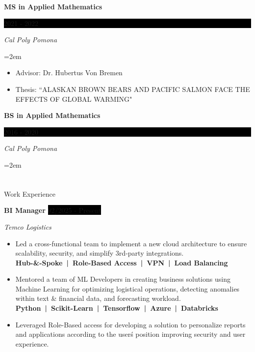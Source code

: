 \documentclass[paper=a4,fontsize=10pt]{scrartcl} %
\newcommand{\sepspace}{\vspace*{1em}}		%
\newcommand{\NewPart}[1]{\section*{\uppercase{#1}}}
\newcommand{\EducationEntry}[4]{
		\noindent \textbf{#1} \hfill      %
		\colorbox{Black}{%
			\parbox{5em}{%
			\hfill\color{White}#2}} \par  %
		\noindent \textit{#3} \par        %
		\noindent\hangindent=2em\hangafter=0 \small #4 %
		\normalsize \par}
\newcommand{\WorkEntry}[4]{				  %
		\noindent \textbf{#1} \hfill      %
		\colorbox{Black}{\color{White}#2} \par  %
		\noindent \textit{#3} \par              %
		\noindent \small #4 %
		\normalsize}
\begin{document}

\EducationEntry{MS in Applied Mathematics}{2021 - 2022}{Cal Poly Pomona}
{
\begin{itemize}
    \item Advisor: Dr. Hubertus Von Bremen
    \item Thesis: ``\uppercase{Alaskan Brown Bears and Pacific Salmon Face the Effects of Global Warming}"
\end{itemize}
}
\sepspace

\EducationEntry{BS in Applied Mathematics}{2016 - 2020}{Cal Poly Pomona}



\NewPart{Work Experience}{}

\WorkEntry{BI Manager}
{02/2025 - Present}
{Temco Logistics}
{\begin{itemize}[leftmargin=*]
   \item 
        Led a cross-functional team to implement a new cloud architecture 
        to ensure scalability, security, and simplify 3rd-party 
        integrations.\\ 
        \scriptsize{\textbf{Hub-\&-Spoke~|~Role-Based Access~|~VPN~|~Load Balancing}}\small

    \item 
        Mentored a team of ML Developers in creating business solutions 
        using Machine Learning for optimizing logistical operations, 
        detecting anomalies within text \& financial data, and forecasting 
        workload.\\
        \scriptsize{\textbf{Python~|~Scikit-Learn~|~Tensorflow~|~Azure~|~Databricks}}\small
    \item 
        Leveraged Role-Based access for developing a solution to personalize 
        reports and applications according to the user\'s position improving 
        security and user experience.
\end{itemize}}

\sepspace
\end{document}
